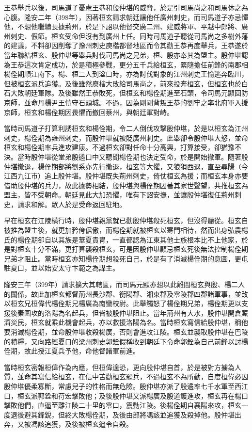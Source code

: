 王恭舉兵以後，司馬道子憂慮王恭和殷仲堪的威脅，於是引司馬尚之和司馬休之為心腹。隆安二年（398年），因著桓玄請求朝廷讓他任廣州刺史，而司馬道子亦忌憚他，不想他繼續長據荊州，於是下詔以他督交廣二州、建威將軍、平越中郎將、廣州刺史、假節。桓玄受命但沒有到廣州上任。同時司馬道子聽從司馬尚之多樹外藩的建議，不料卻因削奪了豫州刺史庾楷都督地區而令其勸王恭再度舉兵，王恭遂於當年聯結桓玄、殷仲堪等舉兵討伐司馬尚之兄弟，桓、殷亦奉其為盟主。殷仲堪認為王恭這次肯定成功，於是積極參戰，更分五千兵給桓玄，緊隨擔任前鋒的南郡相楊佺期順江南下。楊、桓二人到湓口時，亦為討伐對象的江州刺史王愉逃奔臨川，但被桓玄派兵追獲。及後雖然庾楷大敗給司馬尚之，前來投奔桓玄，但桓玄也於白石大敗朝廷軍隊。及後雖然王恭敗死，但桓玄和楊佺期進至石頭，令司馬元顯回防京師，並命丹楊尹王愷守石頭城。不過，因為剛剛背叛王恭的劉牢之率北府軍入援京師，桓玄和楊佺期因畏懼而撤回蔡州，與朝廷軍對峙。

當時司馬道子打算利誘桓玄和楊佺期，令二人倒伐攻擊殷仲堪，於是以桓玄為江州刺史，楊佺期為雍州刺史，而殷仲堪就被貶廣州刺史。此舉卻令殷仲堪大怒，並命桓玄和楊佺期率兵進攻建康。不過桓玄卻對任命十分高興，打算接受，卻猶豫不決。當時殷仲堪從堂弟殷遹口中又聽聞楊佺期也決定受命，於是開始撤軍。隨著殷仲堪撤退，楊佺期部將劉系亦先行撤退，桓玄等大懼，又狼狽西退，直至尋陽（今江西九江市）追上殷仲堪。殷仲堪既失荊州刺史，倚仗桓玄為援；而桓玄本身亦要借助殷仲堪的兵力，故此據勢相結，殷仲堪與楊佺期因著其家世聲望，共推桓玄為盟主，皆不受朝命。朝廷見此大加恐懼，唯有下詔安撫，並讓殷仲堪復任荊州刺史，請求和解。眾人於是受命返回駐地。

早在桓玄在江陵橫行時，殷仲堪親黨就已勸殷仲堪殺死桓玄，但沒得聽從。桓玄自被推為盟主後，就更加矜侉倨傲，而楊佺期就被桓玄以寒門相待，然而出身弘農楊氏的楊佺期卻自以其族是華夏貴冑，一直都認為江東其他士族根本比不上他家，於是對桓玄十分不滿，更打算襲殺桓玄，可是因殷仲堪顧忌桓玄死後無法控制楊佺期兄弟才阻止。當時桓玄亦知楊佺期想殺死自己，於是有了消滅楊佺期的意圖，更屯駐夏口，並以始安太守卞範之為謀主。

隆安三年（399年）請求擴大其轄區，而司馬元顯亦想以此離間桓玄與殷、楊二人的關係，故此加桓玄都督荊州長沙郡、衡陽郡、湘東郡及零陵郡四郡諸軍事，並改以桓玄兄桓偉代楊佺期兄楊廣為南蠻校尉。此舉觸怒了楊佺期兄弟，楊佺期更以支援後秦圍攻的洛陽為名起兵，但皆被殷仲堪阻止。當年荊州有大水，殷仲堪開倉賑濟災民，桓玄就乘此機會起兵，亦以救援洛陽為名。當時桓玄寫信給殷仲堪，稱他要消滅楊佺期，並命殷仲堪收殺楊廣，否則會進攻江陵。桓玄並襲取殷仲堪在巴陵的積糧，又向路經夏口的梁州刺史郭銓假稱收到朝廷下令命郭銓為自己前鋒以討楊佺期，故此授江夏兵予他，命他督諸軍前進。

當時桓玄密報桓偉作為內應，但桓偉遑恐，更向殷仲堪自首，於是被對方擄為人質，並命其寫信給桓玄，在信中苦勸桓玄罷兵，不過桓玄不為所動，自度桓偉必因殷仲堪優柔寡斷，常慮兒子的性格而無危險。殷仲堪亦派了殷遹率七千水軍至西江口，桓玄派郭銓和苻宏擊敗他；及後殷仲堪又派楊廣及殷道護進攻，桓玄再在楊口擊敗他們，直逼至離江陵二十里的零口，震動江陵。後楊佺期自襄陽來攻，桓玄一度退後避其鋒銳，但終大敗楊佺期，及後由部將馮該並追獲及殺掉他。殷仲堪出奔，又被馮該追獲，及後被桓玄逼令自殺。

